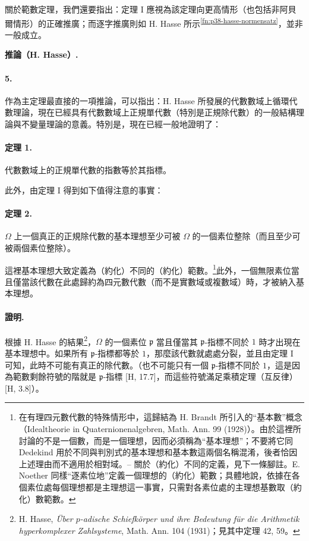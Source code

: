 \documentclass[11pt]{article}
\providecommand{\glqq}{“}
\providecommand{\grqq}{”}
\begin{document}
關於範數定理，我們還要指出：定理 I 應視為該定理向更高情形（也包括非阿貝爾情形）的正確推廣；而逐字推廣則如 H. Hasse 所示\textsuperscript{\ref{fn:p38-hasse-normensatz}}，並非一般成立。

\begin{center}
\textbf{推論（H. Hasse）.}
\end{center}

\paragraph{5.}
作為主定理最直接的一項推論，可以指出：H. Hasse 所發展的代數數域上循環代數理論，現在已經具有代數數域上正規單代數（特別是正規除代數）的一般結構理論與不變量理論的意義。特別是，現在已經一般地證明了：

\paragraph{定理 1.}
代數數域上的正規單代數的指數等於其指標。

此外，由定理 I 得到如下值得注意的事實：

\paragraph{定理 2.}
\(\Omega\) 上一個真正的正規除代數的基本理想至少可被 \(\Omega\) 的一個素位整除（而且至少可被兩個素位整除）。

這裡基本理想大致定義為（約化）不同的（約化）範數。\footnote{在有理四元數代數的特殊情形中，這歸結為 H. Brandt 所引入的\glqq{}基本數\grqq{}概念（Idealtheorie in Quaternionenalgebren, Math. Ann. 99 (1928)）。由於這裡所討論的不是一個數，而是一個理想，因而必須稱為\glqq{}基本理想\grqq{}；不要將它同 Dedekind 用於不同與判別式的基本理想和基本數這兩個名稱混淆，後者恰因上述理由而不適用於相對域。-- 關於（約化）不同的定義，見下一條腳註。E. Noether 同樣\glqq{}逐素位地\grqq{}定義一個理想的（約化）範數；具體地說，依據在各個素位處每個理想都是主理想這一事實，只需對各素位處的主理想基數取（約化）數範數。}此外，一個無限素位當且僅當該代數在此處歸約為四元數代數（而不是實數域或複數域）時，才被納入基本理想。

\paragraph{證明.}
根據 H. Hasse 的結果\footnote{\label{fn:p38-hasse-padisch}H. Hasse, \emph{Über \(p\)-adische Schiefkörper und ihre Bedeutung für die Arithmetik hyperkomplexer Zahlsysteme}, Math. Ann. 104 (1931)；見其中定理 42, 59。}，\(\Omega\) 的一個素位 \(\mathfrak p\) 當且僅當其 \(\mathfrak p\)-指標不同於 \(1\) 時才出現在基本理想中。如果所有 \(\mathfrak p\)-指標都等於 \(1\)，那麼該代數就處處分裂，並且由定理 I 可知，此時不可能有真正的除代數。（也不可能只有一個 \(\mathfrak p\)-指標不同於 \(1\)，這是因為範數剩餘符號的階就是 \(\mathfrak p\)-指標 [H, 17.7]，而這些符號滿足乘積定理（互反律）[H, 3.8]）。
\end{document}
